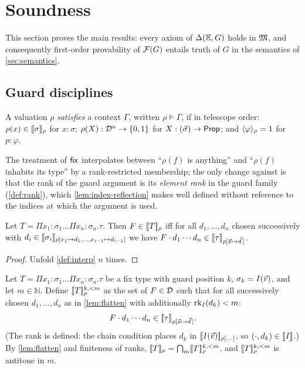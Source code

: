 \section{Soundness}
\label{sec:soundness}

This section proves the main results: every axiom of $\Delta(\mathbb{E},G)$ holds in
$\mathfrak{M}$, and consequently first-order provability of $\mathcal{F}(G)$ entails truth
of $G$ in the semantics of \cref{sec:semantics}.

\subsection{Guard disciplines}
\label{sec:soundness-discipline}

\begin{definition}
\label{def:ctx-sat}
A valuation $\rho$ \emph{satisfies} a context $\Gamma$, written $\rho
\vDash \Gamma$, if in telescope order: $\rho(x) \in [\![ \sigma ]\!]_{\rho}$
for $x : \sigma$; $\rho(X) : \mathcal{D}^n \to \{0,1\}$ for $X :
(\vec{\sigma}) \to \mathsf{Prop}$; and $\langle \varphi \rangle_{\rho} = 1$ for $p :
\varphi$.
\end{definition}

The treatment of $\mathsf{fix}$ interpolates between ``$\rho(f)$ is anything''
and ``$\rho(f)$ inhabits its type'' by a rank-restricted membership; the
only change against \cite{Extraction2026} is that the rank of the guard
argument is its \emph{element rank} in the guard family
(\cref{def:rank}), which \cref{lem:index-reflection} makes well defined
without reference to the indices at which the argument is used.

\begin{lemma}
\label{lem:flatten}
Let $T = \Pi x_1{:}\sigma_1 \dots \Pi x_n{:}\sigma_n.\tau$.  Then $F \in
[\![ T ]\!]_{\rho}$ iff for all $d_1, \dots, d_n$ chosen successively with
$d_i \in [\![ \sigma_i ]\!]_{\rho[x_1 \mapsto d_1, \dots, x_{i-1} \mapsto
d_{i-1}]}$ we have $F \cdot d_1 \cdots d_n \in
[\![ \tau ]\!]_{\rho[\vec{x} \mapsto \vec{d}\,]}$.
\end{lemma}

\begin{proof}
Unfold \cref{def:interp} $n$ times.
\end{proof}

\begin{definition}
\label{def:rank-restricted}
Let $T = \Pi x_1{:}\sigma_1 \dots \Pi x_n{:}\sigma_n.\tau$ be a fix
type with guard position $k$, $\sigma_k = I(\vec{v})$, and let $m \in
\mathbb{N}$.  Define $[\![ T ]\!]_{\rho}^{k, <m}$ as the set of $F \in
\mathcal{D}$ such that for all successively chosen $d_1, \dots, d_n$ as in
\cref{lem:flatten} with additionally $\mathrm{rk}_{I}(d_k) < m$:
\[
  F \cdot d_1 \cdots d_n \in [\![ \tau ]\!]_{\rho[\vec{x} \mapsto
  \vec{d}\,]}.
\]
(The rank is defined: the chain condition places $d_k$ in
$[\![ I(\vec{v}) ]\!]_{\rho[\dots]}$, so $(\cdot, d_k) \in [\![ I ]\!]_{}$.)  By
\cref{lem:flatten} and finiteness of ranks, $[\![ T ]\!]_{\rho} =
\bigcap_{m} [\![ T ]\!]_{\rho}^{k,<m}$, and $[\![ T ]\!]_{\rho}^{k,<m}$ is
antitone in $m$.
\end{definition}

